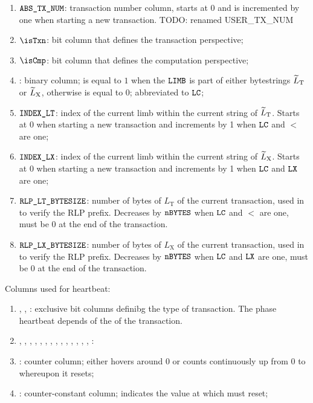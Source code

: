 \begin{enumerate}
    \item $\texttt{ABS\_TX\_NUM}$:
    transaction number column, starts at 0 and is incremented by one when starting a new transaction. TODO: renamed USER_TX_NUM
    \item $\isTxn$:
	bit column that defines the transaction perspective;
	\item $\isCmp$:
	bit column that defines the computation perspective;
	\item {}:
    binary column;
    is equal to $1$ when the $\texttt{LIMB}$ is part of either \rlp{} bytestrings $\widetilde{L}_{\mathrm{T}}$ or $\widetilde{L}_{\mathrm{X}}$, otherwise is equal to $0$;
    abbreviated to $\texttt{LC}$;
    \item $\texttt{INDEX\_LT}$:
    index of the current limb within the current string of $\widetilde{L}_{\mathrm{T}}$. Starts at 0 when starting a new transaction and increments by 1 when $\texttt{LC}$ and $\lt$ are one; 
    \item $\texttt{INDEX\_LX}$:                                                       
    index of the current limb within the current string of $\widetilde{L}_{\mathrm{X}}$. Starts at 0 when starting a new transaction and increments by 1 when $\texttt{LC}$ and $\texttt{LX}$ are one;
    \item $\texttt{RLP\_LT\_BYTESIZE}$:
    number of bytes of $L_{\mathrm{T}}$ of the current transaction, used in \phaseRlpPrefix{} to verify the RLP prefix. Decreases by $\texttt{nBYTES}$ when $\texttt{LC}$ and $\lt$ are one, must be 0 at the end of the transaction.
    \item $\texttt{RLP\_LX\_BYTESIZE}$:
    number of bytes of $L_{\mathrm{X}}$ of the current transaction, used in \phaseRlpPrefix{} to verify the RLP prefix. Decreases by $\texttt{nBYTES}$ when $\texttt{LC}$ and $\texttt{LX}$ are one, must be 0 at the end of the transaction.
\end{enumerate}
Columns used for heartbeat:
\begin{enumerate}[resume]
    \item \typeZeroTx{}, \typeOneTx{}, \typeTwoTx{}:
    exclusive bit columns definibg the type of transaction. The phase heartbeat depends of the \transactionType{} of the transaction.
    \item \phaseRlpPrefix{}, \phaseChainId{}, \phaseNonce{}, \phaseGasPrice{}, \phaseMaxPriorityFeePerGas{}, \phaseMaxFeePerGas{}, \phaseGasLimit{}, \phaseTo{}, \phaseValue{}, \phaseData{}, \phaseAccessList{}, \phaseBeta{}, \phaseY{}, \phaseR{}, \phaseS{}:  
    \item \ct{}:
	counter column; 
	either hovers around $0$ or counts continuously up from $0$ to \maxCt{} whereupon it resets;
    \item \maxCt:
	counter-constant column;
	indicates the value at which \ct{} must reset;
\end{enumerate}
